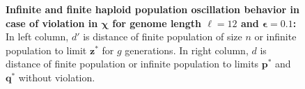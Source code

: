 \begin{figure}[h]
\begin{center}
\hspace{-3em}%
\vspace{-0.5em} \hspace{-3em}%


\caption[\textbf{Infinite and finite haploid population oscillation behavior in case of violation in $\bm{\chi}$ for genome length $\ell = 12$ and $\bm{\epsilon} = 0.1$}]{\textbf{Infinite and finite haploid population oscillation behavior in case of violation in $\bm{\chi}$ for genome length $\ell = 12$ and $\bm{\epsilon} = 0.1$:} 
  In left column, $d'$ is distance of finite population of size $n$ or infinite population to limit $\bm{z}^\ast$ for $g$ generations. In right column, $d$ is distance of finite population or infinite population to limits $\bm{p}^\ast$ and $\bm{q}^\ast$ without violation.}
\label{oscillation_12h_vio_chi_0.1}
\end{center}
\end{figure}

